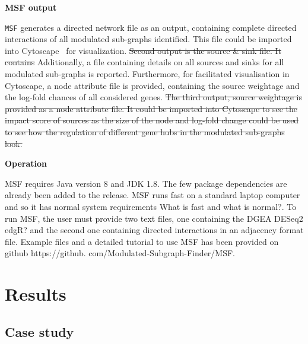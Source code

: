 \documentclass[10pt,a4paper,twocolumn]{article}
\newcommand{\FA}[1]{\begingroup\color{magenta}#1\endgroup}
\newcommand{\TODO}[1]{\begingroup\color{red}#1\endgroup}
\begin{document}
	
	\textbf{MSF output}
	
	\texttt{MSF} generates a directed network file as an output,
        containing complete directed interactions of all modulated
        sub-graphs identified. This file could be imported into
        Cytoscape~\cite{Cyto} for visualization. \sout{Second output
          is the source \& sink file. It contains} \FA{Additionally, a
          file containing details on all sources and sinks for all
          modulated sub-graphs is reported. Furthermore, for
          facilitated visualisation in Cytoscape, a node attribute
          file is provided, containing the source weightage and the
          log-fold chances of all considered genes}. \sout{The third output,
        source weightage is provided as a node attribute file. It
        could be imported into Cytoscape to see the impact score of
        sources as the size of the node and log-fold change could be
        used to see how the regulation of different gene hubs in the
        modulated sub-graphs look.}
	
	\textbf{Operation}
	
	MSF requires Java version 8 and JDK 1.8. The few package
        dependencies are already been added to the release. MSF runs
        fast on a standard laptop computer and so it has normal system
        requirements \TODO{What is fast and what is normal?}. To run
        MSF, the user must provide two text files, one containing the
        DGEA \TODO{DESeq2 edgR?} and the second one containing
        directed interactions in an adjacency format file. Example
        files and a detailed tutorial to use MSF has been provided on
        github https://github. com/Modulated-Subgraph-Finder/MSF.
	
	
	\section*{Results}
	
	\subsection*{Case study}
	
\end{document}

